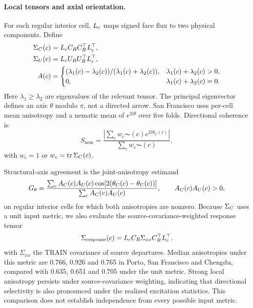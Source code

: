 
\paragraph{Local tensors and axial orientation.} For each regular interior cell, $L_{c}$ maps signed face flux to two physical components. Define
\begin{equation}
\begin{aligned}
 \Sigma_{C}(c)&=L_{c}C_{R}C_{R}^\top L_{c}^\top,\\
 \Sigma_{U}(c)&=L_{c}U_{R}U_{R}^\top L_{c}^\top,\\
 A(c)&=\begin{cases}
 (\lambda_1(c)-\lambda_2(c))/(\lambda_1(c)+\lambda_2(c)),&\lambda_1(c)+\lambda_2(c)>0,\\
 0,&\lambda_1(c)+\lambda_2(c)=0 .
 \end{cases}
\end{aligned}
\label{eq:supp-local-tensors}
\end{equation}
Here $\lambda_1\ge\lambda_2$ are eigenvalues of the relevant tensor. The principal eigenvector defines an axis $\theta$ modulo $\pi$, not a directed arrow. San Francisco uses per-cell mean anisotropy and a nematic mean of $e^{2i\theta}$ over five folds. Directional coherence is
\begin{equation}
 S_{\mathrm{nem}}=\frac{\left|\sum_cw_c\AC(c)e^{2i\theta_C(c)}\right|}
 {\sum_cw_c\AC(c)},
 \label{eq:supp-nematic}
\end{equation}
with $w_c=1$ or $w_c=\operatorname{tr}\Sigma_{C}(c)$.

Structural-axis agreement is the joint-anisotropy estimand
\begin{equation}
 G_\theta=\frac{\sum_cA_{C}(c)A_{U}(c)\cos[2(\theta_C(c)-\theta_U(c))]}{\sum_cA_{C}(c)A_{U}(c)},
 \qquad A_{C}(c)A_{U}(c)>0 ,
 \label{eq:supp-axis-agreement}
\end{equation}
on regular interior cells for which both anisotropies are nonzero. Because $\Sigma_{C}$ uses a unit input metric, we also evaluate the source-covariance-weighted response tensor
\begin{equation}
 \Sigma_{\mathrm{response}}(c)=L_{c}C_{R}\Sigma_{xx}C_{R}^\top L_{c}^\top,
 \label{eq:supp-source-metric}
\end{equation}
with $\Sigma_{xx}$ the TRAIN covariance of source departures. Median anisotropies under this metric are 0.766, 0.926 and 0.765 in Porto, San Francisco and Chengdu, compared with 0.635, 0.651 and 0.705 under the unit metric. Strong local anisotropy persists under source-covariance weighting, indicating that directional selectivity is also pronounced under the realized excitation statistics. This comparison does not establish independence from every possible input metric.

